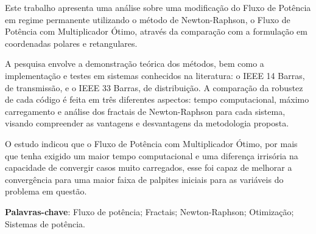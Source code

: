 \begin{resumo}

Este trabalho apresenta uma análise sobre uma modificação do Fluxo de Potência em regime permanente utilizando o método de Newton-Raphson, o Fluxo de Potência com Multiplicador Ótimo, através da comparação com a formulação em coordenadas polares e retangulares. 

A pesquisa envolve a demonstração teórica dos métodos, bem como a implementação e testes em sistemas conhecidos na literatura: o IEEE 14 Barras, de transmissão, e o IEEE 33 Barras, de distribuição. A comparação da robustez de cada código é feita em três diferentes aspectos: tempo computacional, máximo carregamento e análise dos fractais de Newton-Raphson para cada sistema, visando compreender as vantagens e desvantagens da metodologia proposta.

O estudo indicou que o Fluxo de Potência com Multiplicador Ótimo, por mais que tenha exigido um maior tempo computacional e uma diferença irrisória na capacidade de convergir casos muito carregados, esse foi capaz de melhorar a convergência para uma maior faixa de palpites iniciais para as variáveis do problema em questão.


\textbf{Palavras-chave}: Fluxo de potência; Fractais; Newton-Raphson; Otimização; Sistemas de potência.
\end{resumo}
